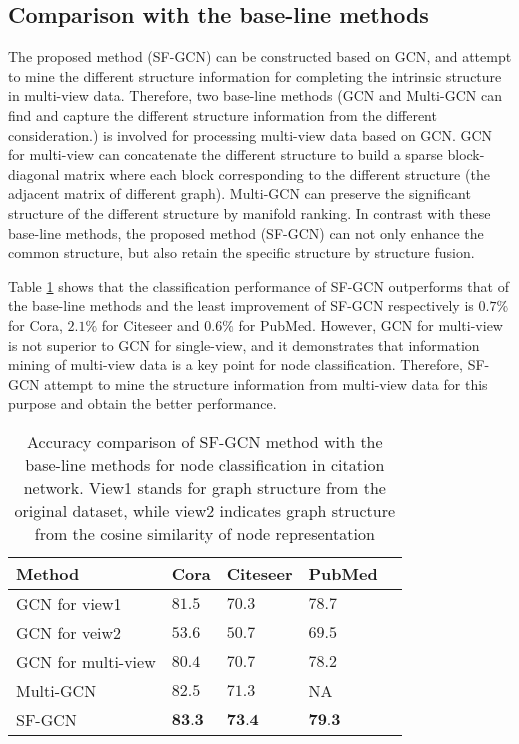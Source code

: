 \documentclass[review]{elsarticle}
\begin{document}
\subsection{Comparison with the base-line methods}
\label{baseline}
The proposed method (SF-GCN) can be constructed based on GCN\cite{kipf2016semi}, and attempt to mine the different structure information for completing the intrinsic structure in multi-view data. Therefore, two base-line methods (GCN and Multi-GCN can find and capture the different structure information from the different consideration.) is involved for processing multi-view data based on GCN. GCN for multi-view\cite{kipf2016semi} can concatenate the different structure to build a sparse block-diagonal matrix where each block corresponding to the different structure (the adjacent matrix of different graph). Multi-GCN \cite{khan2019multi} can preserve the significant structure of the different structure by manifold ranking. In contrast with these base-line methods, the proposed method (SF-GCN) can not only enhance the common structure, but also retain the specific structure by structure fusion.

Table \ref{table2} shows that the classification performance of SF-GCN outperforms that of the base-line methods and the least improvement of SF-GCN respectively is $0.7\%$ for Cora, $2.1\%$ for Citeseer and $0.6\%$ for PubMed. However, GCN for multi-view is not superior to GCN for single-view, and it demonstrates that information mining of multi-view data is a key point for node classification. Therefore, SF-GCN attempt to mine the structure information from multi-view data for this purpose and obtain the better performance.

\begin{table}[!ht]
\small
\renewcommand{\arraystretch}{1.0}
\caption{Accuracy comparison of SF-GCN method with the base-line methods for node classification in citation network. View1 stands for graph structure from the original dataset, while view2 indicates graph structure from the cosine similarity of node representation}
\label{table2}
\begin{center}
\newcommand{\tabincell}[2]{\begin{tabular}{@{}#1@{}}#2\end{tabular}}
\begin{tabular}{lp{1cm}p{1cm}p{1cm}p{1cm}}
\hline
\bfseries Method &\bfseries Cora &\bfseries Citeseer &\bfseries PubMed  \\
\hline \hline
GCN \cite{kipf2016semi} for view1  & $81.5$   &$70.3$ & $78.7$    \\
\hline
GCN \cite{kipf2016semi} for veiw2  & $53.6$   &$50.7$ & $69.5$   \\
\hline
GCN \cite{kipf2016semi} for multi-view  & $80.4$   &$70.7$ & $78.2$  \\
\hline
Multi-GCN  \cite{khan2019multi} & $82.5$   &$71.3$  &NA  \\
\hline\hline
SF-GCN  & $\textbf{83.3}$   &$\textbf{73.4}$  & $\textbf{79.3}$  \\
\hline
\end{tabular}
\end{center}
\end{table}
\end{document}
